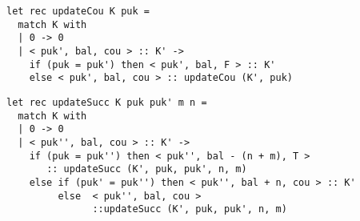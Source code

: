 \documentclass[a4paper]{llncs}
\begin{document}
\begin{verbatim}
let rec updateCou K puk =
  match K with
  | 0 -> 0
  | < puk', bal, cou > :: K' ->
    if (puk = puk') then < puk', bal, F > :: K'
    else < puk', bal, cou > :: updateCou (K', puk)
\end{verbatim}

\begin{verbatim}
let rec updateSucc K puk puk' m n =
  match K with
  | 0 -> 0
  | < puk'', bal, cou > :: K' ->
    if (puk = puk'') then < puk'', bal - (n + m), T > 
       :: updateSucc (K', puk, puk', n, m)
    else if (puk' = puk'') then < puk'', bal + n, cou > :: K'
         else  < puk'', bal, cou > 
               ::updateSucc (K', puk, puk', n, m)
\end{verbatim}
\end{document}

